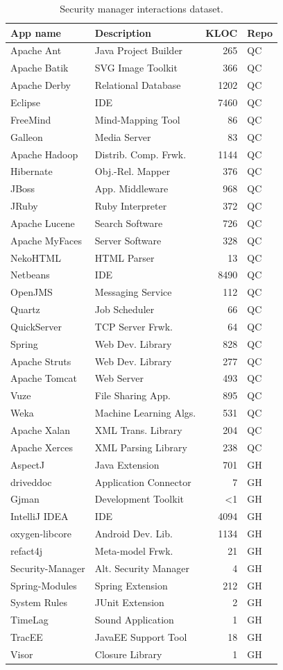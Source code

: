 \documentclass{sig-alternate-05-2015}
\begin{document}
\begin{table}
\small
\caption{Security manager interactions
  dataset.\label{Table:applications-studied}}
\begin{tabular}{llrl}
\toprule 
App name & Description & KLOC & Repo\tabularnewline
\midrule
Apache Ant & Java Project Builder & 265 & QC\tabularnewline
Apache Batik & SVG Image Toolkit & 366 & QC\tabularnewline
Apache Derby & Relational Database & 1202 & QC\tabularnewline
Eclipse  & IDE & 7460 & QC\tabularnewline
FreeMind & Mind-Mapping Tool & 86 & QC\tabularnewline
Galleon & Media Server & 83 & QC\tabularnewline
Apache Hadoop & Distrib. Comp. Frwk. & 1144 & QC\tabularnewline
Hibernate & Obj.-Rel. Mapper & 376 & QC\tabularnewline
JBoss & App. Middleware & 968 & QC\tabularnewline
JRuby & Ruby Interpreter & 372 & QC\tabularnewline
Apache Lucene & Search Software & 726 & QC\tabularnewline
Apache MyFaces & Server Software & 328 & QC\tabularnewline
NekoHTML & HTML Parser & 13 & QC\tabularnewline
Netbeans & IDE & 8490 & QC\tabularnewline
OpenJMS & Messaging Service & 112 & QC\tabularnewline
Quartz  & Job Scheduler & 66 & QC\tabularnewline
QuickServer & TCP Server Frwk. & 64 & QC\tabularnewline
Spring & Web Dev. Library & 828 & QC\tabularnewline
Apache Struts & Web Dev. Library & 277 & QC\tabularnewline
Apache Tomcat & Web Server & 493 & QC\tabularnewline
Vuze & File Sharing App. & 895 & QC\tabularnewline
Weka & Machine Learning Algs. & 531 & QC\tabularnewline
Apache Xalan & XML Trans. Library & 204 & QC\tabularnewline
Apache Xerces & XML Parsing Library & 238 & QC\tabularnewline
AspectJ & Java Extension & 701 & GH\tabularnewline
driveddoc & Application Connector & 7 & GH\tabularnewline
Gjman & Development Toolkit & <1 & GH\tabularnewline
IntelliJ IDEA & IDE & 4094 & GH\tabularnewline
oxygen-libcore & Android Dev. Lib. & 1134 & GH\tabularnewline
refact4j & Meta-model Frwk. & 21 & GH\tabularnewline
Security-Manager & Alt. Security Manager & 4 & GH\tabularnewline
Spring-Modules & Spring Extension & 212 & GH\tabularnewline
System Rules & JUnit Extension & 2 & GH\tabularnewline
TimeLag & Sound Application & 1 & GH\tabularnewline
TracEE & JavaEE Support Tool & 18 & GH\tabularnewline
Visor & Closure Library & 1 & GH\tabularnewline
\bottomrule
\end{tabular}
\end{table}
\end{document}
